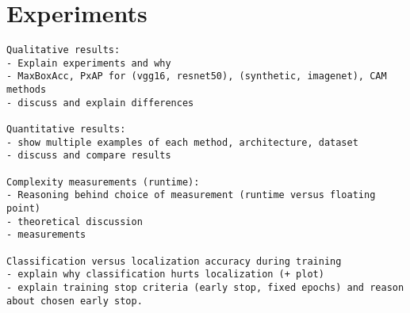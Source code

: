 \chapter{Experiments}

\begin{verbatim}
Qualitative results:
- Explain experiments and why
- MaxBoxAcc, PxAP for (vgg16, resnet50), (synthetic, imagenet), CAM methods
- discuss and explain differences

Quantitative results:
- show multiple examples of each method, architecture, dataset
- discuss and compare results

Complexity measurements (runtime):
- Reasoning behind choice of measurement (runtime versus floating point)
- theoretical discussion
- measurements

Classification versus localization accuracy during training
- explain why classification hurts localization (+ plot)
- explain training stop criteria (early stop, fixed epochs) and reason about chosen early stop.
\end{verbatim}

